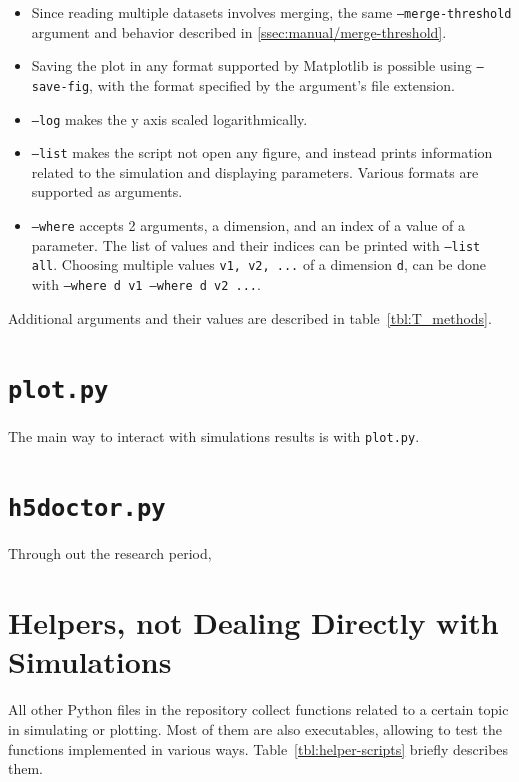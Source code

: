 \begin{itemize}
	\item Since reading multiple datasets involves merging, the same \texttt{--merge-threshold} argument and behavior described in \ref{ssec:manual/merge-threshold}.
	\item Saving the plot in any format supported by Matplotlib is possible using \texttt{--save-fig}, with the format specified by the argument's file extension.
	\item \texttt{--log} makes the y axis scaled logarithmically. 
	\item \texttt{--list} makes the script not open any figure, and instead prints information related to the simulation and displaying parameters. Various formats are supported as arguments.
	\item \texttt{--where} accepts 2 arguments, a dimension, and an index of a value of a parameter. The list of values and their indices can be printed with \texttt{--list all}. Choosing multiple values \texttt{v1, v2, ...} of a dimension \texttt{d}, can be done with \texttt{--where d v1 --where d v2 ...}.
\end{itemize}

Additional arguments and their values are described in table~\ref{tbl:T_methods}.

\section{\texttt{plot.py}}\label{sec:manual/plot}

The main way to interact with simulations results is with \texttt{plot.py}.


\section{\texttt{h5doctor.py}}

Through out the research period,

\section{Helpers, not Dealing Directly with Simulations}

All other Python files in the repository collect functions related to a certain topic in simulating or plotting. Most of them are also executables, allowing to test the functions implemented in various ways. Table~\ref{tbl:helper-scripts} briefly describes them.

